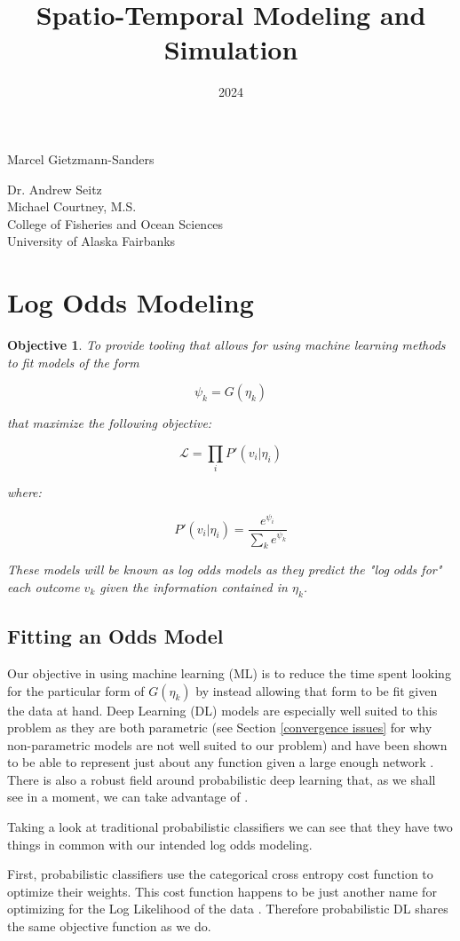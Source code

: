 \documentclass[11pt]{article}
\title{Spatio-Temporal Modeling and Simulation}
\date{2024}
\makeatletter
\newtheorem{objective}{Objective}
\renewcommand{\maketitle}{
\begin{center}

\pagestyle{empty}
\phantom{.}  %
\vspace{3cm}

{\Huge \bf \@title\par}
\vspace{2.5cm}

{\LARGE Marcel Gietzmann-Sanders}\\[1cm]

{\Large\@date}

\vspace{2.5cm}
{\Large Dr. Andrew Seitz}\hspace{2cm}{\Large Dr. Curry Cunningham}\\[2cm]{\Large Michael Courtney, M.S.}\\[2cm]
College of Fisheries and Ocean Sciences\\
University of Alaska Fairbanks


\end{center}
}\makeatother
\makeatother
\begin{document}
\maketitle
\newpage
\tableofcontents
\newpage

\section{Log Odds Modeling}

\begin{objective}
To provide tooling that allows for using machine learning methods to fit models of the form

$$\psi_k = G(\eta_k)$$

that maximize the following objective:


$$\mathcal{L}=\prod_i P'(v_i | \eta_i)$$

where:

$$P'(v_i|\eta_i) = \frac{e^{\psi_i}}{\sum_k e^{\psi_k}}$$

These models will be known as log odds models as they predict the "log odds for" each outcome $v_k$ given the information contained in $\eta_k$. 

\end{objective}

\subsection{Fitting an Odds Model}

Our objective in using machine learning (ML) is to reduce the time spent looking for the particular form of $G(\eta_k)$ by instead allowing that form to be fit given the data at hand. Deep Learning (DL) models are especially well suited to this problem as they are both parametric (see Section \ref{convergence issues} for why non-parametric models are not well suited to our problem) and have been shown to be able to represent just about any function given a large enough network \cite{LiquetMokaNazarathy2024DeepLearning}. There is also a robust field around probabilistic deep learning that, as we shall see in a moment, we can take advantage of \cite{durr}.
\newline

Taking a look at traditional probabilistic classifiers we can see that they have two things in common with our intended log odds modeling. 

First, probabilistic classifiers use the categorical cross entropy cost function to optimize their weights. This cost function happens to be just another name for optimizing for the Log Likelihood of the data \cite{durr}. Therefore probabilistic DL shares the same objective function as we do.
\end{document}
